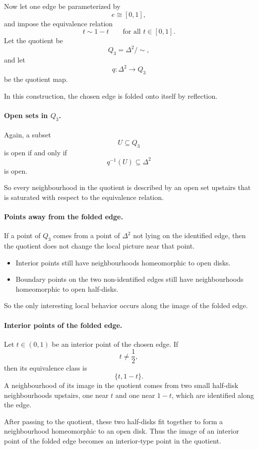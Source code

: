 \documentclass[12pt,a4paper]{article}
\theoremstyle{notespace}
\begin{document}
Now let one edge be parameterized by
\[
e\cong [0,1],
\]
and impose the equivalence relation
\[
t\sim 1-t
\qquad
\text{for all } t\in [0,1].
\]
Let the quotient be
\[
Q_3=\Delta^2/\!\sim,
\]
and let
\[
q:\Delta^2\to Q_3
\]
be the quotient map.

In this construction, the chosen edge is folded onto itself by reflection.

\paragraph{Open sets in \(Q_3\).}
Again, a subset
\[
U\subseteq Q_3
\]
is open if and only if
\[
q^{-1}(U)\subseteq \Delta^2
\]
is open.

So every neighbourhood in the quotient is described by an open set upstairs that is saturated with respect to the equivalence relation.

\paragraph{Points away from the folded edge.}
If a point of \(Q_3\) comes from a point of \(\Delta^2\) not lying on the identified edge, then the quotient does not change the local picture near that point.

\begin{itemize}
	\item Interior points still have neighbourhoods homeomorphic to open disks.
	\item Boundary points on the two non-identified edges still have neighbourhoods homeomorphic to open half-disks.
\end{itemize}

So the only interesting local behavior occurs along the image of the folded edge.

\paragraph{Interior points of the folded edge.}
Let \(t\in (0,1)\) be an interior point of the chosen edge. If
\[
t\neq \frac12,
\]
then its equivalence class is
\[
\{t,1-t\}.
\]
A neighbourhood of its image in the quotient comes from two small half-disk neighbourhoods upstairs, one near \(t\) and one near \(1-t\), which are identified along the edge.

After passing to the quotient, these two half-disks fit together to form a neighbourhood homeomorphic to an open disk. Thus the image of an interior point of the folded edge becomes an interior-type point in the quotient.
\end{document}
